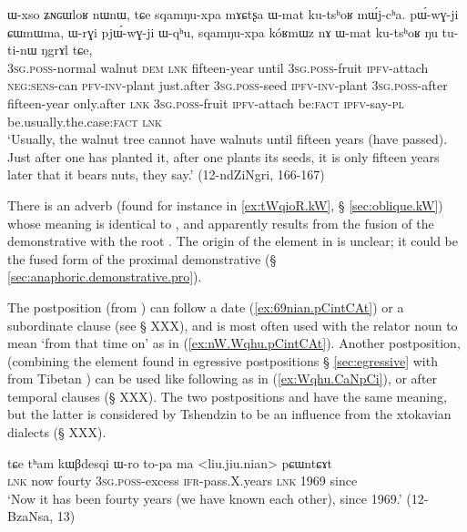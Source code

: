 \begin{exe}
\ex \label{ex:sqamNuxpa.koRmWz}
\gll ɯ-xso ʑɴɢɯloʁ nɯnɯ, tɕe sqamŋu-xpa mɤɕtʂa ɯ-mat ku-tsʰoʁ mɯ́j-cʰa. pɯ́-wɣ-ji ɕɯmɯma, ɯ-rɣi pjɯ́-wɣ-ji ɯ-qʰu,  sqamŋu-xpa kóʁmɯz nɤ ɯ-mat ku-tsʰoʁ ŋu tu-ti-nɯ ŋgrɤl tɕe,  \\
\textsc{3sg}.\textsc{poss}-normal walnut  \textsc{dem} \textsc{lnk} fifteen-year until \textsc{3sg}.\textsc{poss}-fruit \textsc{ipfv}-attach \textsc{neg}:\textsc{sens}-can \textsc{pfv}-\textsc{inv}-plant just.after \textsc{3sg}.\textsc{poss}-seed \textsc{ipfv}-\textsc{inv}-plant \textsc{3sg}.\textsc{poss}-after fifteen-year only.after \textsc{lnk} \textsc{3sg}.\textsc{poss}-fruit \textsc{ipfv}-attach be:\textsc{fact} \textsc{ipfv}-say-\textsc{pl} be.usually.the.case:\textsc{fact} \textsc{lnk} \\
\glt `Usually, the walnut tree cannot have walnuts until fifteen years (have passed). Just after one has planted it, after one plants its seeds, it is only fifteen years later that it bears nuts, they say.' (12-ndZiNgri, 166-167)
\end{exe}

There is an adverb  (found for instance in \ref{ex:tWqioR.kW}, § \ref{sec:oblique.kW}) whose meaning is identical to , and apparently results from the fusion of the demonstrative  with the root . The origin of the  element in  is unclear; it could be the fused form of the proximal demonstrative  (§ \ref{sec:anaphoric.demonstrative.pro}).


The postposition  (from ) can follow a date (\ref{ex:69nian.pCintCAt}) or a subordinate clause (see § XXX), and is most often used with the relator noun  to mean `from that time on' as in (\ref{ex:nW.Wqhu.pCintCAt}). Another postposition,   (combining the  element found in egressive postpositions § \ref{sec:egressive}  with  from Tibetan ) can be used like  following   as in (\ref{ex:Wqhu.CaNpCi}), or after temporal clauses (§ XXX). The two postpositions  and  have the same meaning, but the latter is considered by Tshendzin to be an influence from the xtokavian dialects (§ XXX).

 \begin{exe}
\ex \label{ex:69nian.pCintCAt}
 \gll tɕe tʰam kɯβdesqi ɯ-ro to-pa ma <liu.jiu.nian> pɕɯntɕɤt \\
 \textsc{lnk} now fourty \textsc{3sg}.\textsc{poss}-excess \textsc{ifr}-pass.X.years \textsc{lnk}  1969 since \\
 \glt `Now it has been fourty years (we have known each other), since 1969.' (12-BzaNsa, 13)
 \end{exe}
 
